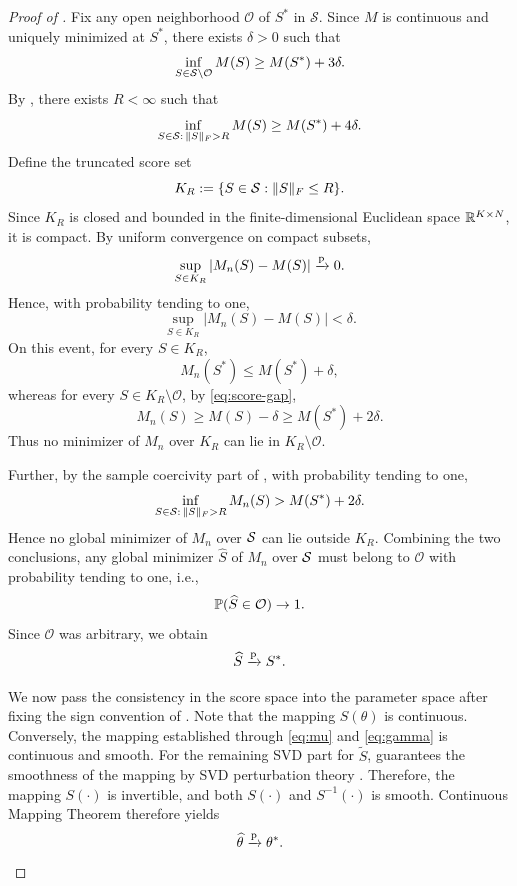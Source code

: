 \documentclass{article}
\begin{document}
\begin{bibunit}[unsrtnat]
\begin{proof}[Proof of ]
Fix any open neighborhood $\mathcal O$ of $S^\ast$ in $\mathcal S$. Since $M$ is continuous and uniquely minimized at $S^\ast$, there exists $\delta>0$ such that
\begin{equation}\label{eq:score-gap}
\inf_{S\in{\mathcal{S}}\setminus\mathcal O} M(S)\ge M(S^\ast)+3\delta.
\end{equation}
By , there exists $R<\infty$ such that
\begin{equation}\label{eq:score-ball-gap}
\inf_{S\in{\mathcal{S}}:\,\|S\|_F>R} M(S)\ge M(S^\ast)+4\delta.
\end{equation}
Define the truncated score set
\[
K_R:=\{S\in{\mathcal{S}}:\|S\|_F\le R\}.
\]
Since $K_R$ is closed and bounded in the finite-dimensional Euclidean space $\mathbb{R}^{K\times N}$, it is compact. By uniform convergence on compact subsets,
\[
\sup_{S\in K_R}|M_n(S)-M(S)|\xrightarrow{\textup{p}} 0.
\]
Hence, with probability tending to one,
\[
\sup_{S\in K_R}|M_n(S)-M(S)|<\delta.
\]
On this event, for every $S\in K_R$,
\[
M_n(S^\ast)\le M(S^\ast)+\delta,
\]
whereas for every $S\in K_R\setminus\mathcal O$, by \eqref{eq:score-gap},
\[
M_n(S)\ge M(S)-\delta\ge M(S^\ast)+2\delta.
\]
Thus no minimizer of $M_n$ over $K_R$ can lie in $K_R\setminus\mathcal O$.

Further, by the sample coercivity part of , with probability tending to one,
\[
\inf_{S\in{\mathcal{S}}:\,\|S\|_F>R} M_n(S)>M(S^\ast)+2\delta.
\]
Hence no global minimizer of $M_n$ over ${\mathcal{S}}$ can lie outside $K_R$. Combining the two conclusions, any global minimizer $\hat S$ of $M_n$ over ${\mathcal{S}}$ must belong to $\mathcal O$ with probability tending to one, i.e.,
\[
\mathbb{P}(\widehat S\in\mathcal O)\to 1.
\]
Since $\mathcal O$ was arbitrary, we obtain
\[
\widehat S\xrightarrow{\textup{p}} S^\ast.
\]


We now pass the consistency in the score space into the parameter space after fixing the sign convention of . Note that the mapping $S(\theta)$ is continuous. Conversely, the mapping established through \eqref{eq:mu} and \eqref{eq:gamma} is continuous and smooth. For the remaining SVD part for $\tilde{S}$,  guarantees the smoothness of the mapping by SVD perturbation theory \cite{bunse1991numerical,malvetti2022analytic}. Therefore, the mapping $S(\cdot)$ is invertible, and both $S(\cdot)$ and $S^{-1}(\cdot)$ is smooth. Continuous Mapping Theorem therefore yields
\[
\widehat \theta \xrightarrow{\textup{p}} \theta^*.
\]


\end{proof}
\end{bibunit}
\end{document}
